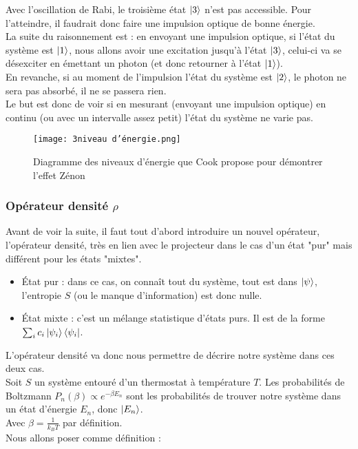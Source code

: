 \documentclass[11pt]{article}
\begin{document}
\vspace{0.3cm}
Avec l'oscillation de Rabi, le troisième état $\ket{3}$ n'est pas accessible. Pour l'atteindre, il faudrait donc faire une impulsion optique de bonne énergie.\\
\vspace{0.5cm}
\qquad La suite du raisonnement est : en envoyant une impulsion optique, si l'état du système est $\ket{1}$, nous allons avoir une excitation jusqu'à l'état $\ket{3}$, celui-ci va se désexciter en émettant un photon (et donc retourner à l'état $\ket{1}$).\\
En revanche, si au moment de l'impulsion l'état du système est $\ket{2}$, le photon ne sera pas absorbé, il ne se passera rien.\\
Le but est donc de voir si en mesurant (envoyant une impulsion optique) en continu (ou avec un intervalle assez petit) l'état du système ne varie pas.
\vspace{0.5cm}
\begin{figure}[h]
 \caption{\label{étiquette} Diagramme des niveaux d'énergie que Cook propose pour démontrer l'effet Zénon~\cite{figure}}
 \texttt{[image: 3niveau d'énergie.png]}
 \centering
 \end{figure}

\newpage

\subsubsection{Opérateur densité $\rho $}

Avant de voir la suite, il faut tout d'abord introduire un nouvel opérateur, l'opérateur densité, très en lien avec le projecteur dans le cas d'un état "pur" mais différent pour les états "mixtes".

\begin{itemize}
    \renewcommand{\labelitemi}{$\cdot$}
    \item État pur : dans ce cas, on connaît tout du système, tout est dans $\ket{\psi}$, l'entropie $S$ (ou le manque d'information) est donc nulle.
    \item État mixte : c'est un mélange statistique d'états purs. Il est de la forme $\sum_i c_i \ket{\psi_i}\bra{\psi_i}$.
\end{itemize}
\vspace{0.2cm}
L'opérateur densité va donc nous permettre de décrire notre système dans ces deux cas.\\
\vspace{0.3cm}
\qquad Soit $S$ un système entouré d'un thermostat à température $T$. Les probabilités de Boltzmann $P_n(\beta) \propto e^{-\beta E_n}$ sont les probabilités de trouver notre système dans un état d'énergie $E_n$, donc $\ket{E_n}$.\\
\vspace{0.2cm}
Avec $\beta = \frac{1}{k_B T}$ par définition.\\
\vspace{0.3cm}
Nous allons poser comme définition :
\end{document}
